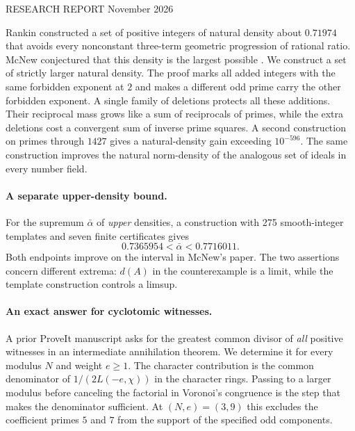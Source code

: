 \documentclass[11pt,letterpaper]{article}
\begin{document}
\thispagestyle{empty}
\noindent\textcolor{ink}{\small\sffamily RESEARCH REPORT}\hfill {\small{} November 2026}
\par\vspace{8pt}\noindent{\color{ink}\rule{\linewidth}{0.8pt}}\par\vspace{7pt}
\par\vspace{4pt}
\par\vspace{9pt}

\noindent Rankin constructed a set of positive integers of natural density about $0.71974$ that avoids every nonconstant three-term geometric progression of rational ratio. McNew conjectured that this density is the largest possible \cite[Conj.~7.2]{mcnew}. We construct a set of strictly larger natural density. The proof marks all added integers with the same forbidden exponent at $2$ and makes a different odd prime carry the other forbidden exponent. A single family of deletions protects all these additions. Their reciprocal mass grows like a sum of reciprocals of primes, while the extra deletions cost a convergent sum of inverse prime squares. A second construction on primes through $1427$ gives a natural-density gain exceeding $10^{-596}$. The same construction improves the natural norm-density of the analogous set of ideals in every number field.

\paragraph{A separate upper-density bound.} For the supremum $\bar\alpha$ of \emph{upper} densities, a construction with 275 smooth-integer templates and seven finite certificates gives
\[
                  0.7365954<\bar\alpha<0.7716011.
\]
Both endpoints improve on the interval in McNew's paper. The two assertions concern different extrema: $d(A)$ in the counterexample is a limit, while the template construction controls a limsup.

\paragraph{An exact answer for cyclotomic witnesses.}
A prior ProveIt manuscript asks for the greatest common divisor of \emph{all} positive witnesses in an intermediate annihilation theorem. We determine it for every modulus $N$ and weight $e\ge1$. The character contribution is the common denominator of $1/(2L(-e,\chi))$ in the character rings. Passing to a larger modulus before canceling the factorial in Voronoi's congruence is the step that makes the denominator sufficient. At $(N,e)=(3,9)$ this excludes the coefficient primes $5$ and $7$ from the support of the specified odd components.
\end{document}
